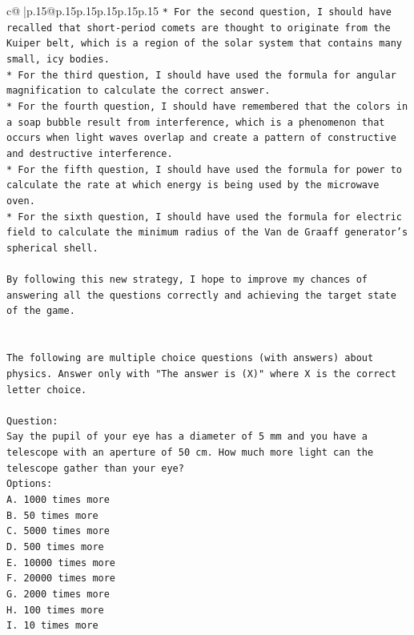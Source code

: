 \documentclass{article}
\begin{document}
{\begin{supertabular}{c@{$\;$}|p{.15\linewidth}@{}p{.15\linewidth}p{.15\linewidth}p{.15\linewidth}p{.15\linewidth}p{.15\linewidth}}
{{{\texttt{* For the second question, I should have recalled that short{-}period comets are thought to originate from the Kuiper belt, which is a region of the solar system that contains many small, icy bodies.} \\
\texttt{* For the third question, I should have used the formula for angular magnification to calculate the correct answer.} \\
\texttt{* For the fourth question, I should have remembered that the colors in a soap bubble result from interference, which is a phenomenon that occurs when light waves overlap and create a pattern of constructive and destructive interference.} \\
\texttt{* For the fifth question, I should have used the formula for power to calculate the rate at which energy is being used by the microwave oven.} \\
\texttt{* For the sixth question, I should have used the formula for electric field to calculate the minimum radius of the Van de Graaff generator's spherical shell.} \\
\\ 
\texttt{By following this new strategy, I hope to improve my chances of answering all the questions correctly and achieving the target state of the game.} \\
\\ 
\\ 
\texttt{The following are multiple choice questions (with answers) about physics. Answer only with "The answer is (X)" where X is the correct letter choice.} \\
\\ 
\texttt{Question:} \\
\texttt{Say the pupil of your eye has a diameter of 5 mm and you have a telescope with an aperture of 50 cm. How much more light can the telescope gather than your eye?} \\
\texttt{Options:} \\
\texttt{A. 1000 times more} \\
\texttt{B. 50 times more} \\
\texttt{C. 5000 times more} \\
\texttt{D. 500 times more} \\
\texttt{E. 10000 times more} \\
\texttt{F. 20000 times more} \\
\texttt{G. 2000 times more} \\
\texttt{H. 100 times more} \\
\texttt{I. 10 times more} \\
}}}
\end{supertabular}}
\end{document}
